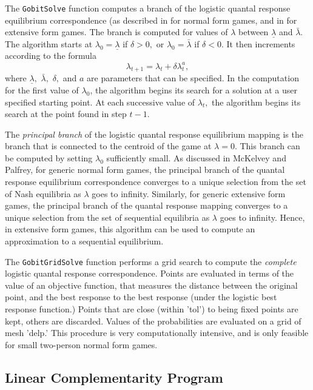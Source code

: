 The {\tt GobitSolve} function computes a branch of the logistic
quantal response equilibrium correspondence (as described in
\cite{McKPal:95a} for normal form games, and in
\cite{McKPal:95b} for extensive form games.  The branch is
computed for values of $\lambda$ between $\underline{\lambda}$ and
$\bar{\lambda}.$ The algorithm starts at $\lambda_0 =
\underline{\lambda}$ if $\delta>0,$ or $\lambda_0 = \bar{\lambda}$ if
$\delta<0$. It then increments according to the formula
$$
\lambda_{t+1} = \lambda_t +\delta \lambda_t^a,
$$ 
where $\underline\lambda,$ $\bar\lambda,$ $\delta,$ and $a$ are
parameters that can be specified.  In the computation for the first value of
$\lambda_0$, the algorithm begins its search for a solution at a user
specified starting point.  At each
successive value of $\lambda_t,$ the algorithm begins its search at
the point found in step $t - 1.$ 

The {\em principal branch} of the logistic quantal response
equilibrium mapping is the branch that is connected to the centroid of
the game at $\lambda = 0$.  This branch can be computed by setting
$\lambda_0$ sufficiently small.  As discussed in McKelvey and Palfrey,
for generic normal form games, the principal branch of the quantal
response equilibrium correspondence converges to a unique selection
from the set of Nash equilibria as $\lambda$ goes to infinity.
Similarly, for generic extensive form games, the principal branch of
the quantal response mapping converges to a unique selection from the
set of sequential equilibria as $\lambda$ goes to infinity.  Hence, in
extensive form games, this algorithm can be used to compute an
approximation to a sequential equilibrium.

The {\tt GobitGridSolve} function performs a grid search to compute
the {\em complete} logistic quantal response correspondence.  Points
are evaluated in terms of the value of an objective function, that
measures the distance between the original point, and the best
response to the best response (under the logistic best response
function.)  Points that are close (within 'tol') to being fixed points
are kept, others are discarded.  Values of the probabilities are
evaluated on a grid of mesh 'delp.'  This procedure is very
computationally intensive, and is only feasible for small two-person
normal form games.

\subsection{Linear Complementarity Program}

